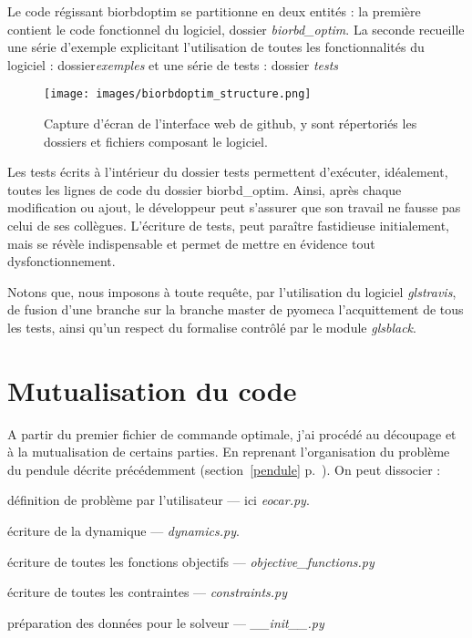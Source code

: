 Le code régissant \gls{biorbdoptim} se partitionne en deux entités : la première contient le code fonctionnel du logiciel, dossier \emph{biorbd\_optim}. La seconde recueille une série d'exemple explicitant l'utilisation de toutes les fonctionnalités du logiciel : dossier\emph{exemples} et une série de tests : dossier \emph{tests}
\begin{figure}[h]
\begin{center}
\texttt{[image: images/biorbdoptim\_structure.png]}
\caption{Capture d'écran de l'interface web de github, y sont répertoriés les dossiers et fichiers composant le logiciel.}
\end{center}
\end{figure}
Les tests écrits à l'intérieur du dossier tests permettent d'exécuter, idéalement, toutes les lignes de code du dossier biorbd\_optim. Ainsi, après chaque modification ou ajout, le développeur peut s'assurer que son travail ne fausse pas celui de ses collègues. L'écriture de tests, peut paraître fastidieuse initialement, mais se révèle indispensable et permet de mettre en évidence tout dysfonctionnement.

Notons que, nous imposons à toute requête, par l'utilisation du logiciel \emph{gls{travis}}, de fusion d'une branche sur la branche master de pyomeca  l'acquittement de tous les tests, ainsi qu'un respect du formalise contrôlé par le module \emph{gls{black}}.


        \section{Mutualisation du code}
        
A partir du premier fichier de commande optimale, j'ai procédé au découpage et à la mutualisation de certains parties. En reprenant l’organisation du problème du pendule décrite précédemment (section~\ref{pendule} p.~\pageref{pendule}). On peut dissocier :

\begin{description}
\setlength\itemsep{-0.2em}
\item [les degrés de liberté et le nombre de nœuds :] définition de problème par l'utilisateur  --- ici \emph{eocar.py}.
\item [système dynamique :] écriture de la dynamique --- \emph{dynamics.py}.
\item [fonctions objectif :] écriture de toutes les fonctions objectifs --- \emph{objective\_functions.py}
\item [les contraintes :] écriture de toutes les contraintes --- \emph{constraints.py}
\item [l'appel au solveur :] préparation des données pour le solveur  --- \emph{\_\_init\_\_.py}
\end{description}

